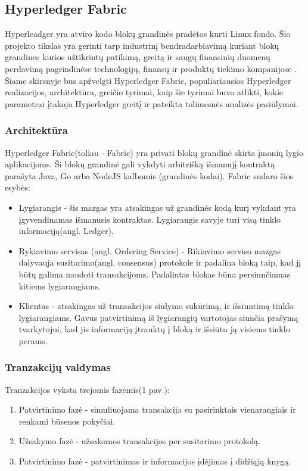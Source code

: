 \documentclass{VUMIFPSkursinis}
\begin{document}
\subsection{Hyperledger Fabric}
Hyperleadger yra atviro kodo blokų grandinės pradėtos kurti Linux fondo. Šio projekto tikslas yra gerinti tarp industrinį bendradarbiavimą kuriant blokų grandines kurios užtikrintų 
patikimą, greitą ir saugų finansinių duomenų perdavimą pagrindinėse technologijų, finansų ir produktų tiekimo kompanijose \cite{LinuxHyper}. Šiame skirsnyje bus apžvelgti 
Hyperledger Fabric, populiariausios Hyperledger realizacijos, architektūra, greičio tyrimai, kaip šie tyrimai buvo atlikti, kokie parametrai įtakoja Hyperledger greitį ir pateikta tolimesnės analizės pasiūlymai. 
\subsubsection{Architektūra}
Hyperledger Fabric(toliau - Fabric) yra privati blokų grandinė skirta įmonių lygio aplikacijoms. 
Ši blokų grandinė gali vykdyti arbitrišką išmanujį kontraktą parašyta Java, Go arba NodeJS kalbomis (grandinės kodai).
Fabric sudaro šios esybės:
\begin{itemize}
\item{Lygiarangis - šis mazgas yra atsakingas už grandinės kodą kurį vykdant yra įgyvendinamas išmanusis kontraktas. 
Lygiarangis savyje turi visą tinklo informaciją(angl. Ledger). }
\item{Rykiavimo servisas (angl. Ordering Service) - Rikiavimo serviso mazgas dalyvauja susitarimo(angl. consensus) 
protokole ir padalina bloką taip, kad jį būtų galima naudoti transakcijoms. Padalintas blokas būna persiunčiamas kitiems lygiarangiams.}
\item{Klientas - atsakingas už transakcijos siūlymo sukūrimą, ir išsiuntimą tinklo lygiarangiams. Gavus patvirtinimą iš lygiarangių vartotojas siunčia prašymą tvarkytojui, kad jis informaciją įtrauktų į bloką ir išsiūtu ją visiems tinklo perams.}
\end{itemize}
\subsubsection{Tranzakcijų valdymas}
Tranzakcijos vyksta trejomis fazėmis(1 pav.):
\begin{enumerate}
\item{Patvirtinimo fazė - simuliuojama transakcija su pasirinktais vienarangiais ir renkami būsenos pokyčiai.}
\item{Užsakymo fazė - užsakomos transakcijos per susitarimo protokolą.}
\item{Patvirtinimo fazė - patvirtinimas ir informacijos įdėjimas į didžiąją knygą.}
\end{enumerate}
\end{document}

